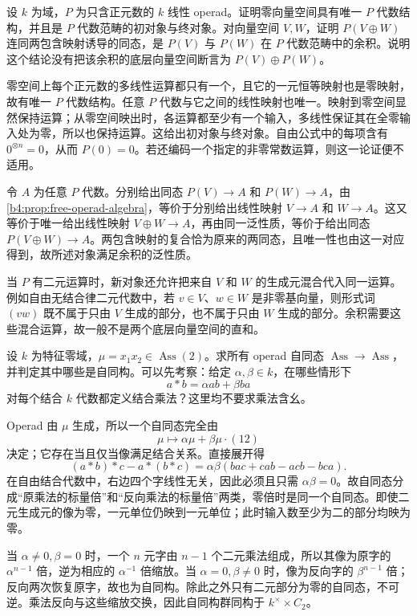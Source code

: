 \begin{exercise}\label{b4:ex:free-operad-coproduct}
	设 \(k\) 为域，\(P\) 为只含正元数的 \(k\) 线性 operad。证明零向量空间具有唯一 \(P\) 代数结构，并且是 \(P\) 代数范畴的初对象与终对象。对向量空间 \(V,W\)，证明 \(P(V\oplus W)\) 连同两包含映射诱导的同态，是 \(P(V)\) 与 \(P(W)\) 在 \(P\) 代数范畴中的余积。说明这个结论没有把该余积的底层向量空间断言为 \(P(V)\oplus P(W)\)。
\end{exercise}
\begin{solution}
	零空间上每个正元数的多线性运算都只有一个，且它的一元恒等映射也是零映射，故有唯一 \(P\) 代数结构。任意 \(P\) 代数与它之间的线性映射也唯一。映射到零空间显然保持运算；从零空间映出时，各运算都至少有一个输入，多线性保证其在全零输入处为零，所以也保持运算。这给出初对象与终对象。自由公式中的每项含有 \(0^{\otimes n}=0\)，从而 \(P(0)=0\)。若还编码一个指定的非零常数运算，则这一论证便不适用。

	令 \(A\) 为任意 \(P\) 代数。分别给出同态 \(P(V)\rightarrow A\) 和 \(P(W)\rightarrow A\)，由\cref{b4:prop:free-operad-algebra}，等价于分别给出线性映射 \(V\rightarrow A\) 和 \(W\rightarrow A\)。这又等价于唯一给出线性映射 \(V\oplus W\rightarrow A\)，再由同一泛性质，等价于给出同态 \(P(V\oplus W)\rightarrow A\)。两包含映射的复合恰为原来的两同态，且唯一性也由这一对应得到，故所述对象满足余积的泛性质。

	当 \(P\) 有二元运算时，新对象还允许把来自 \(V\) 和 \(W\) 的生成元混合代入同一运算。例如自由无结合律二元代数中，若 \(v\in V\)、\(w\in W\) 是非零基向量，则形式词 \((vw)\) 既不属于只由 \(V\) 生成的部分，也不属于只由 \(W\) 生成的部分。余积需要这些混合运算，故一般不是两个底层向量空间的直和。
\end{solution}
\begin{exercise}\label{b4:ex:ass-operad-endomorphisms}
	设 \(k\) 为特征零域，\(\mu=x_1x_2\in\operatorname{Ass}(2)\)。求所有 operad 自同态 \(\operatorname{Ass}\to\operatorname{Ass}\)，并判定其中哪些是自同构。可以先考察：给定 \(\alpha,\beta\in k\)，在哪些情形下
	\[
		a*b=\alpha ab+\beta ba
	\]
	对每个结合 \(k\) 代数都定义结合乘法？这里均不要求乘法含幺。
\end{exercise}
\begin{solution}
	Operad 由 \(\mu\) 生成，所以一个自同态完全由
	\[
		\mu\longmapsto\alpha\mu+\beta\mu\cdot(12)
	\]
	决定；它存在当且仅当像满足结合关系。直接展开得
	\[
		(a*b)*c-a*(b*c)
		=\alpha\beta(bac+cab-acb-bca).
	\]
	在自由结合代数中，右边四个字线性无关，因此必须且只需 \(\alpha\beta=0\)。故自同态分成“原乘法的标量倍”和“反向乘法的标量倍”两类，零倍时是同一个自同态。即使二元生成元的像为零，一元单位仍映到一元单位；此时输入数至少为二的部分均映为零。

	当 \(\alpha\ne0,\beta=0\) 时，一个 \(n\) 元字由 \(n-1\) 个二元乘法组成，所以其像为原字的 \(\alpha^{n-1}\) 倍，逆为相应的 \(\alpha^{-1}\) 倍缩放。当 \(\alpha=0,\beta\ne0\) 时，像为反向字的 \(\beta^{n-1}\) 倍；反向两次恢复原字，故也为自同构。除此之外只有二元部分为零的自同态，不可逆。乘法反向与这些缩放交换，因此自同构群同构于 \(k^\times\times C_2\)。
\end{solution}

